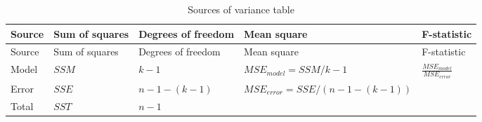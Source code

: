 \documentclass[
  letterpaper,
  8pt,
  a4paper]{book}
\begin{document}
\begin{longtable}[]{@{}
  >{\raggedright\arraybackslash}p{}
  >{\raggedright\arraybackslash}p{}
  >{\raggedright\arraybackslash}p{}
  >{\raggedright\arraybackslash}p{}
  >{\raggedright\arraybackslash}p{}@{}}
\caption{Sources of variance table}\tabularnewline
\toprule\noalign{}
\begin{minipage}[b]{\linewidth}\raggedright
Source
\end{minipage} & \begin{minipage}[b]{\linewidth}\raggedright
Sum of squares
\end{minipage} & \begin{minipage}[b]{\linewidth}\raggedright
Degrees of freedom
\end{minipage} & \begin{minipage}[b]{\linewidth}\raggedright
Mean square
\end{minipage} & \begin{minipage}[b]{\linewidth}\raggedright
F-statistic
\end{minipage} \\
\midrule\noalign{}
\endfirsthead
\toprule\noalign{}
\begin{minipage}[b]{\linewidth}\raggedright
Source
\end{minipage} & \begin{minipage}[b]{\linewidth}\raggedright
Sum of squares
\end{minipage} & \begin{minipage}[b]{\linewidth}\raggedright
Degrees of freedom
\end{minipage} & \begin{minipage}[b]{\linewidth}\raggedright
Mean square
\end{minipage} & \begin{minipage}[b]{\linewidth}\raggedright
F-statistic
\end{minipage} \\
\midrule\noalign{}
\endhead
\bottomrule\noalign{}
\endlastfoot
Model & \(SSM\) & \(k-1\) & \(MSE_{model} = SSM / k-1\) &
\(\frac{MSE_{model}}{MSE_{error}}\) \\
Error & \(SSE\) & \(n - 1 - (k-1)\) &
\(MSE_{error} = SSE / (n - 1 - (k-1))\) & \\
Total & \(SST\) & \(n - 1\) & & \\
\end{longtable}
\end{document}
